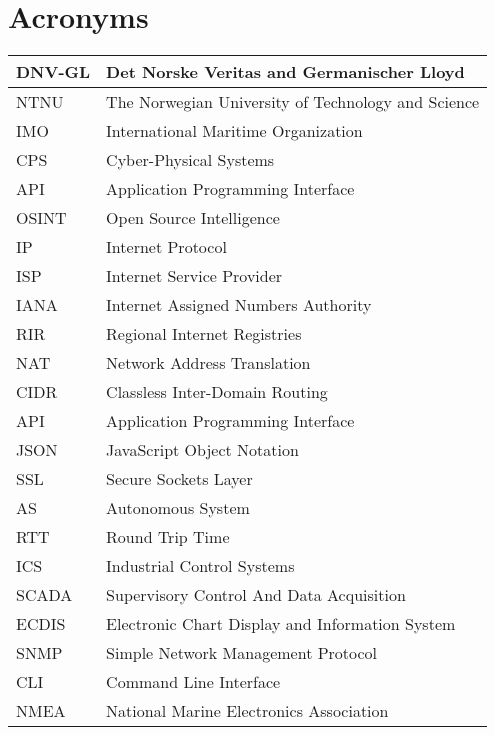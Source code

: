 \section{Acronyms} \label{app:acronyms}

\begin{table}[H]
\centering
\begin{tabular}{|l|l|}
\hline
    DNV-GL & Det Norske Veritas and Germanischer Lloyd\\ \hline
    NTNU & The Norwegian University of Technology and Science\\ \hline
    IMO & International Maritime Organization\\ \hline
    CPS & Cyber-Physical Systems\\ \hline
    API & Application Programming Interface\\ \hline
    OSINT & Open Source Intelligence \\ \hline
    IP & Internet Protocol \\ \hline
    ISP & Internet Service Provider \\ \hline
    IANA & Internet Assigned Numbers Authority \\ \hline
    RIR & Regional Internet Registries \\ \hline
    NAT & Network Address Translation \\ \hline
    CIDR & Classless Inter-Domain Routing\\ \hline
    API & Application Programming Interface \\ \hline
    JSON & JavaScript Object Notation \\ \hline
    SSL & Secure Sockets Layer \\ \hline
    AS & Autonomous System \\ \hline
    RTT & Round Trip Time \\ \hline
    ICS &  Industrial Control Systems \\ \hline
    SCADA & Supervisory Control And Data Acquisition \\ \hline
    ECDIS & Electronic Chart Display and Information System \\ \hline
    SNMP & Simple Network Management Protocol \\ \hline
    CLI & Command Line Interface \\ \hline
    NMEA & National Marine Electronics Association \\ \hline

\end{tabular}
\end{table}
